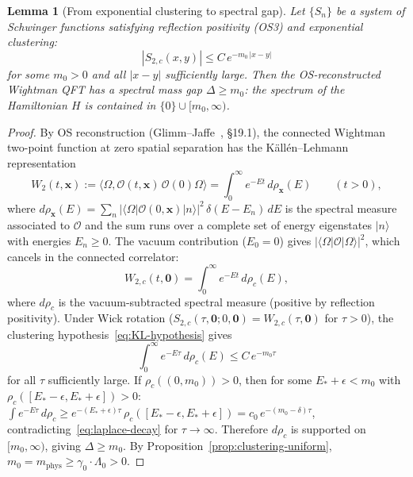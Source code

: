\documentclass[11pt]{article}
\newtheorem{lemma}[theorem]{Lemma}
\theoremstyle{definition}
\begin{document}
\begin{lemma}[From exponential clustering to spectral gap]%
\label{lem:KL-gap}
Let $\{S_n\}$ be a system of Schwinger functions satisfying
reflection positivity \textup{(OS3)} and exponential clustering:
\begin{equation}\label{eq:KL-hypothesis}
|S_{2,c}(x,y)|\le C\,e^{-m_0\,|x-y|}
\end{equation}
for some $m_0>0$ and all $|x-y|$ sufficiently large.
Then the OS-reconstructed Wightman QFT has a spectral mass gap
$\Delta\ge m_0$: the spectrum of the Hamiltonian $H$ is
contained in $\{0\}\cup[m_0,\infty)$.
\end{lemma}

\begin{proof}
By OS reconstruction (Glimm--Jaffe~\cite{GlimmJaffe}, \S19.1),
the connected Wightman two-point function at zero spatial separation
has the K\"all\'en--Lehmann representation
\begin{equation}\label{eq:KL-rep}
W_2(t,\mathbf{x}):=
\langle\Omega,\mathcal{O}(t,\mathbf{x})\,
\mathcal{O}(0)\Omega\rangle
=\int_0^\infty e^{-Et}\,d\rho_{\mathbf{x}}(E)
\qquad(t>0),
\end{equation}
where $d\rho_{\mathbf{x}}(E)
=\sum_n|\langle\Omega|\mathcal{O}(0,\mathbf{x})|n\rangle|^2
\,\delta(E-E_n)\,dE$
is the spectral measure associated to $\mathcal{O}$
and the sum runs over a complete set of energy
eigenstates $|n\rangle$ with energies $E_n\ge 0$.
The vacuum contribution ($E_0=0$) gives
$|\langle\Omega|\mathcal{O}|\Omega\rangle|^2$,
which cancels in the connected correlator:
\begin{equation}\label{eq:KL-connected}
W_{2,c}(t,\mathbf{0})
=\int_0^\infty e^{-Et}\,d\rho_c(E),
\end{equation}
where $d\rho_c$ is the vacuum-subtracted spectral measure
(positive by reflection positivity).
Under Wick rotation ($S_{2,c}(\tau,\mathbf{0};0,\mathbf{0})
=W_{2,c}(\tau,\mathbf{0})$ for $\tau>0$),
the clustering hypothesis~\eqref{eq:KL-hypothesis} gives
\begin{equation}\label{eq:laplace-decay}
\int_0^\infty e^{-E\tau}\,d\rho_c(E)
\le C\,e^{-m_0\tau}
\end{equation}
for all $\tau$ sufficiently large.
If $\rho_c((0,m_0))>0$, then for some
$E_*+\epsilon<m_0$ with
$\rho_c([E_*-\epsilon,E_*+\epsilon])>0$:
$\int e^{-E\tau}\,d\rho_c
\ge e^{-(E_*+\epsilon)\tau}\,
\rho_c([E_*-\epsilon,E_*+\epsilon])
=c_0\,e^{-(m_0-\delta)\tau}$,
contradicting~\eqref{eq:laplace-decay} for $\tau\to\infty$.
Therefore $d\rho_c$ is supported on $[m_0,\infty)$,
giving $\Delta\ge m_0$.
By Proposition~\ref{prop:clustering-uniform},
$m_0=m_{\mathrm{phys}}\ge\gamma_0\cdot\Lambda_0>0$.
\end{proof}
\end{document}
